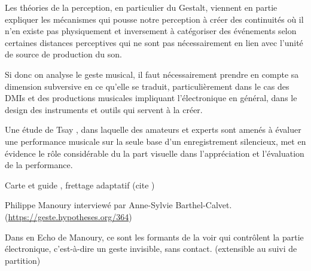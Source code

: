 Les théories de la perception, en particulier du Gestalt, viennent en partie expliquer les mécanismes qui pousse notre perception à créer des continuités où il n'en existe pas physiquement et inversement à catégoriser des événements selon certaines distances perceptives qui ne sont pas nécessairement en lien avec l'unité de source de production du son.

Si donc on analyse le geste musical, il faut nécessairement prendre en compte sa dimension subversive en ce qu'elle se traduit, particulièrement dans le cas des \glspl{DMI} et des productions musicales impliquant l'électronique en général, dans le design des instruments et outils qui servent à la créer.

\cite{bin_show_2018}

Une étude de Tsay \cite{tsay_sight_2013}, dans laquelle des amateurs et experts sont amenés à évaluer une performance musicale sur la seule base d'un enregistrement silencieux, met en évidence le rôle considérable du la part visuelle dans l'appréciation et l'évaluation de la performance.

Carte et guide , frettage adaptatif (cite \cite{goudard_playing_2014})


 Philippe Manoury interviewé par Anne-Sylvie Barthel-Calvet. (\url{https://geste.hypotheses.org/364})

Dans en Echo de Manoury, ce sont les formants de la voir qui contrôlent la partie électronique, c'est-à-dire un geste invisible, sans contact. (extensible au suivi de partition)


